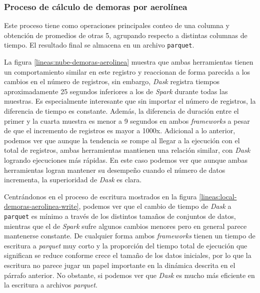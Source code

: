 \subsubsection{Proceso de cálculo de demoras por aerolínea}

Este proceso tiene como operaciones principales conteo de una columna y obtención de promedios de otras 5, agrupando respecto a distintas columnas de tiempo. El resultado final se almacena en un archivo \texttt{parquet}.

La figura \ref{lineas:nube-demoras-aerolinea} muestra que ambas herramientas tienen un comportamiento similar en este registro y reaccionan de forma parecida a los cambios en el número de registros, sin embargo, \textit{Dask} registra tiempos aproximadamente 25 segundos inferiores a los de \textit{Spark} durante todas las muestras. Es especialmente interesante que sin importar el número de registros, la diferencia de tiempo es constante. Además, la diferencia de duración entre el primer y la cuarta muestra es menor a 9 segundos en ambos \textit{frameworks} a pesar de que el incremento de registros es mayor a 1000x. Adicional a lo anterior, podemos ver que aunque la tendencia se rompe al llegar a la ejecución con el total de registros, ambas herramientas mantienen una relación similar, con \textit{Dask} logrando ejecuciones más rápidas. En este caso podemos ver que aunque ambas herramientas logran mantener su desempeño cuando el número de datos incrementa, la superioridad de \textit{Dask} es clara.

Centrándonos en el proceso de escritura mostrados en la figura \ref{lineas:local-demoras-aerolinea-write}, podemos ver que el cambio de tiempo de \textit{Dask} a \texttt{parquet} es mínimo a través de los distintos tamaños de conjuntos de datos, mientras que el de \textit{Spark} sufre algunos cambios menores pero en general parece mantenerse constante. De cualquier forma ambos \textit{frameworks} tienen un tiempo de escritura a \textit{parquet} muy corto y la proporción del tiempo total de ejecución que significan se reduce conforme crece el tamaño de los datos iniciales, por lo que la escritura no parece jugar un papel importante en la dinámica descrita en el párrafo anterior. No obstante, si podemos ver que \textit{Dask} es mucho más eficiente en la escritura a archivos \textit{parquet}.

